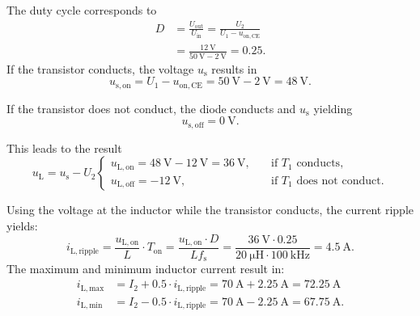 \begin{solutionblock}
    The duty cycle corresponds to
    \begin{equation*}
        \begin{aligned}
            D&=\frac{U_\mathrm{out}}{U_\mathrm{in}}=\frac{U_\mathrm{2}}{U_\mathrm{1}-u_\mathrm{on,CE}} \\
            &=\frac{\SI{12}{\volt}}{\SI{50}{\volt}-\SI{2}{\volt}}=0.25.
        \end{aligned}
        \label{eq:dutycycle}
    \end{equation*}
    If the transistor conducts, the voltage $u_\mathrm{s}$ results in
    \begin{equation*}
        u_\mathrm{s,on}=U_\mathrm{1}-u_\mathrm{on,CE}=\SI{50}{\volt}-\SI{2}{\volt}=\SI{48}{\volt}.
        \label{eq:u_on}
    \end{equation*}

    If the transistor does not conduct, the diode conducts and $u_\mathrm{s}$ yielding
    \begin{equation*}
        u_\mathrm{s,off}=\SI{0}{\volt}.
        \label{eq:u_off}
    \end{equation*}

    This leads to the result
    \begin{equation*}
        u_\mathrm{L}= u_\mathrm{s}-U_\mathrm{2}
        \begin{cases}
            u_\mathrm{L,on}= \SI{48}{\volt}-\SI{12}{\volt} = \SI{36}{\volt}, \quad  &\text{if $T_1$ conducts}, \\
            u_\mathrm{L,off}= -\SI{12}{\volt}, \quad &\text{if $T_1$ does not conduct}.
        \end{cases}
    \end{equation*}

    Using the voltage at the inductor while the transistor conducts, the current ripple yields:
    \begin{equation*}
            i_\mathrm{L,ripple}= \frac{u_\mathrm{L,on}}{L} \cdot T_\mathrm{on} 
            =\frac{u_\mathrm{L,on} \cdot D}{L f_\mathrm{s}}
            =\frac{ \SI{36}{\volt} \cdot 0.25} {\SI{20}{\micro\henry} 
            \cdot \SI{100}{\kilo\hertz}} = \SI{4.5}{\ampere}.
    \end{equation*}
    The maximum and minimum inductor current result in:
    \begin{equation*}
        \begin{aligned}
            i_\mathrm{L,max}&= I_\mathrm{2} + 0.5 \cdot i_\mathrm{L,ripple} = \SI{70}{\ampere} + \SI{2.25}{\ampere} = \SI{72.25}{\ampere} \\
            i_\mathrm{L,min}&= I_\mathrm{2} - 0.5 \cdot i_\mathrm{L,ripple} = \SI{70}{\ampere} - \SI{2.25}{\ampere} = \SI{67.75}{\ampere}.
        \end{aligned}
    \end{equation*}
        
    

\end{solutionblock}

